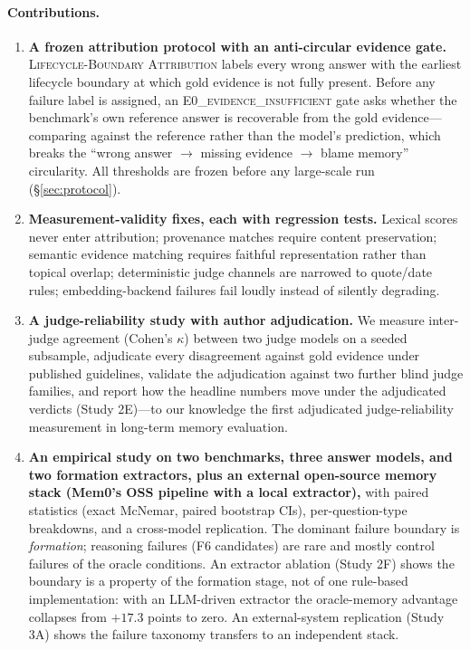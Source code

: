 \documentclass[11pt]{article}
\newcommand{\protocol}{\textsc{Lifecycle-Boundary Attribution}}
\newcommand{\ezero}{E0\textsc{\_evidence\_insufficient}}
\begin{document}
\paragraph{Contributions.}
\begin{enumerate}
\item \textbf{A frozen attribution protocol with an anti-circular evidence
gate.} \protocol{} labels every wrong answer with the earliest lifecycle
boundary at which gold evidence is not fully present. Before any failure
label is assigned, an \ezero{} gate asks whether the benchmark's own
reference answer is recoverable from the gold evidence---comparing against
the reference rather than the model's prediction, which breaks the
``wrong answer $\to$ missing evidence $\to$ blame memory'' circularity. All
thresholds are frozen before any large-scale run (\S\ref{sec:protocol}).
\item \textbf{Measurement-validity fixes, each with regression tests.}
Lexical scores never enter attribution; provenance matches require
content preservation; semantic evidence matching requires faithful
representation rather than topical overlap; deterministic judge channels
are narrowed to quote/date rules; embedding-backend failures fail loudly
instead of silently degrading.
\item \textbf{A judge-reliability study with author adjudication.} We
measure inter-judge agreement (Cohen's $\kappa$) between two judge models
on a seeded subsample, adjudicate every disagreement against gold
evidence under published guidelines, validate the adjudication against
two further blind judge families, and report how the headline numbers
move under the adjudicated verdicts (Study 2E)---to our knowledge the
first adjudicated judge-reliability measurement in long-term memory
evaluation.
\item \textbf{An empirical study on two benchmarks, three answer models, and
two formation extractors, plus an external open-source memory stack
(Mem0's OSS pipeline with a local extractor),} with paired statistics (exact McNemar, paired
bootstrap CIs), per-question-type breakdowns, and a cross-model
replication. The dominant failure boundary is \emph{formation}; reasoning
failures (F6 candidates) are rare and mostly control failures of the
oracle conditions. An extractor ablation (Study 2F) shows the boundary
is a property of the formation stage, not of one rule-based
implementation: with an LLM-driven extractor the oracle-memory advantage
collapses from $+17.3$ points to zero. An external-system replication
(Study 3A) shows the failure taxonomy transfers to an independent stack.
\end{enumerate}
\end{document}
